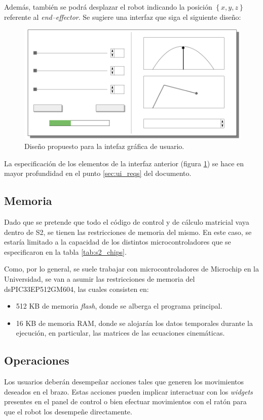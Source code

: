 Además, también se podrá desplazar el robot indicando la posición $\left\{x, y, z\right\}$ referente al \textit{end--effector}. Se sugiere una interfaz que siga el siguiente diseño:

\begin{figure}[H]
    \centering
    \includegraphics[width=\linewidth]{images/InterfaceSketch-MkII.png}
    \caption{Diseño propuesto para la intefaz gráfica de usuario.}
    \label{fig:ui_design}
\end{figure}

La especificación de los elementos de la interfaz anterior (figura \ref{fig:ui_design}) se hace en mayor profundidad en el punto \ref{sec:ui_reqs} del documento.

\subsection{Memoria}

Dado que se pretende que todo el código de control y de cálculo matricial vaya dentro de \ac{S2}, se tienen las restricciones de memoria del mismo. En este caso, se estaría limitado a la capacidad de los
distintos microcontroladores que se especificaron en la tabla \ref{tab:s2_chips}.

Como, por lo general, se suele trabajar con microcontroladores de Microchip en
la Universidad, se van a asumir las restricciones de memoria del dsPIC33EP512GM604,
las cuales consisten en:

\begin{itemize}
    \item 512 KB de memoria \textit{flash}, donde se alberga el programa principal.
    \item 16 KB de memoria \ac{RAM}, donde se alojarán los datos temporales durante la ejecución, en particular, las matrices de las ecuaciones cinemáticas.
\end{itemize} 

\subsection{Operaciones}

Los usuarios deberán desempeñar acciones tales que generen los movimientos deseados en el brazo. Estas acciones pueden implicar interactuar con los \textit{widgets} presentes en el panel de control o bien efectuar movimientos con el ratón para que el robot los desempeñe directamente.
